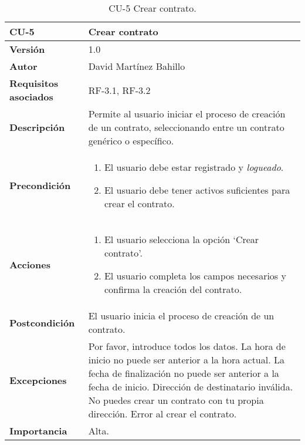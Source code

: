 \begin{table}[p]
	\centering
	\begin{tabularx}{\linewidth}{ p{} p{} }
		\toprule
		\textbf{CU-5}    & \textbf{Crear contrato}\\
		\midrule
		\textbf{Versión}              & 1.0    \\
		\textbf{Autor}                & David Martínez Bahillo \\
		\textbf{Requisitos asociados} & RF-3.1, RF-3.2 \\
		\textbf{Descripción}          & Permite al usuario iniciar el proceso de creación de un contrato, seleccionando entre un contrato genérico o específico. \\
		\textbf{Precondición}         &  
		\begin{enumerate}
			\def\labelenumi{\arabic{enumi}.}
			\tightlist
			\item El usuario debe estar registrado y \textit{logueado}.
			\item El usuario debe tener activos suficientes para crear el contrato.
		\end{enumerate}\\
		\textbf{Acciones}             &
		\begin{enumerate}
			\def\labelenumi{\arabic{enumi}.}
			\tightlist
			\item El usuario selecciona la opción `Crear contrato'.
			\item El usuario completa los campos necesarios y confirma la creación del contrato.
		\end{enumerate}\\
		\textbf{Postcondición}        & El usuario inicia el proceso de creación de un contrato. \\
		\textbf{Excepciones}          & Por favor, introduce todos los datos. La hora de inicio no puede ser
		 anterior a la hora actual. La fecha de finalización no puede ser anterior a la fecha de inicio.
		 Dirección de destinatario inválida. No puedes crear un contrato con tu propia dirección. Error al
		 crear el contrato.  \\
		\textbf{Importancia}          & Alta.  \\
		\bottomrule
	\end{tabularx}
	\caption{CU-5 Crear contrato.}
\end{table}


